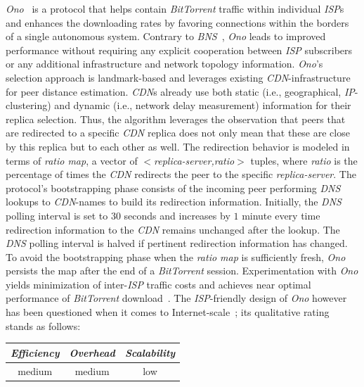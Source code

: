 \emph{Ono}~\cite{CB2008} is a protocol that helps contain
{\sl BitTorrent} traffic within individual \emph{ISP}s
and enhances the downloading rates by favoring connections
within the borders of a single autonomous system. Contrary to
\emph{BNS}~\cite{BCCMSBZ2006},
\emph{Ono} leads to improved performance 
without requiring any explicit cooperation between 
\emph{ISP} subscribers or any additional
infrastructure and network topology information.
\emph{Ono}'s selection approach is 
landmark-based and leverages existing {\sl CDN}-infrastructure 
for peer distance estimation. {\sl CDN}s already use both static (i.e.,
geographical, \emph{IP}-clustering) and dynamic (i.e., network delay measurement)
information for their replica selection. Thus, the algorithm leverages the
observation that peers that are redirected to a specific {\sl CDN} replica does not
only mean that these are close by this replica but to each other as well.
The redirection behavior is modeled in terms of \emph{ratio map}, 
a vector of \emph{$<$replica-server,ratio$>$} tuples, where \emph{ratio} is
the percentage of times the {\sl CDN} redirects the peer 
to the specific \emph{replica-server}.
The protocol's bootstrapping phase consists of the incoming peer performing
{\sl DNS} lookups to {\sl CDN}-names to build its redirection information.
Initially, the {\sl DNS} polling interval is set to $30$ seconds 
and increases by $1$ minute every time redirection information 
to the {\sl CDN} remains unchanged after the lookup.
The {\sl DNS} polling interval is halved if pertinent 
redirection information has changed.
To avoid the bootstrapping phase when the \emph{ratio map} 
is sufficiently fresh, 
\emph{Ono} persists the map after the end of a {\sl BitTorrent} session.
Experimentation with \emph{Ono} yields minimization of
inter-\emph{ISP} traffic costs and achieves near optimal performance 
of {\sl BitTorrent} download~\cite{BCCMSBZ2006}.
The \emph{ISP}-friendly design of \emph{Ono} however has been questioned when 
it comes to Internet-scale~\cite{PMJKA2009,LCLX2009,CLYSR2011};
its qualitative rating stands as follows:
\begin{center}
{\footnotesize
\begin{tabular}{ccc}
\emph{Efficiency} & \emph{Overhead} & \emph{Scalability} \\
\hline
medium &
medium &
low
\end{tabular}
}
\end{center}

